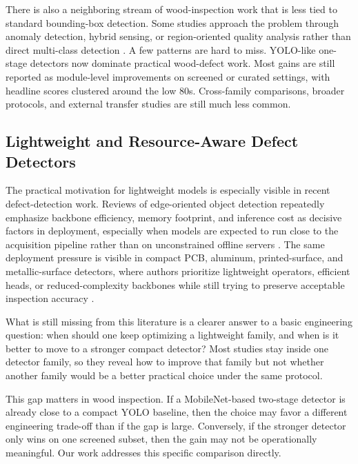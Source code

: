 There is also a neighboring stream of wood-inspection work that is less tied to standard bounding-box detection. Some studies approach the problem through anomaly detection, hybrid sensing, or region-oriented quality analysis rather than direct multi-class detection \citep{kilic_2024,kilic_2025_wd_detector,cmc_wood_area_attention}. A few patterns are hard to miss. YOLO-like one-stage detectors now dominate practical wood-defect work. Most gains are still reported as module-level improvements on screened or curated settings, with headline scores clustered around the low 80s. Cross-family comparisons, broader protocols, and external transfer studies are still much less common.

\subsection{Lightweight and Resource-Aware Defect Detectors}

The practical motivation for lightweight models is especially visible in recent defect-detection work. Reviews of edge-oriented object detection repeatedly emphasize backbone efficiency, memory footprint, and inference cost as decisive factors in deployment, especially when models are expected to run close to the acquisition pipeline rather than on unconstrained offline servers \citep{mittal_2024}. The same deployment pressure is visible in compact PCB, aluminum, printed-surface, and metallic-surface detectors, where authors prioritize lightweight operators, efficient heads, or reduced-complexity backbones while still trying to preserve acceptable inspection accuracy \citep{cmc_pcb_yolov8,cmc_yolo_rlc,cmc_cg_yolov8,cmc_aluminum_yolov8n,cmc_printed_positive,cmc_channel_shuffle}. 

What is still missing from this literature is a clearer answer to a basic engineering question: when should one keep optimizing a lightweight family, and when is it better to move to a stronger compact detector? Most studies stay inside one detector family, so they reveal how to improve that family but not whether another family would be a better practical choice under the same protocol.

This gap matters in wood inspection. If a MobileNet-based two-stage detector is already close to a compact YOLO baseline, then the choice may favor a different engineering trade-off than if the gap is large. Conversely, if the stronger detector only wins on one screened subset, then the gain may not be operationally meaningful. Our work addresses this specific comparison directly.

